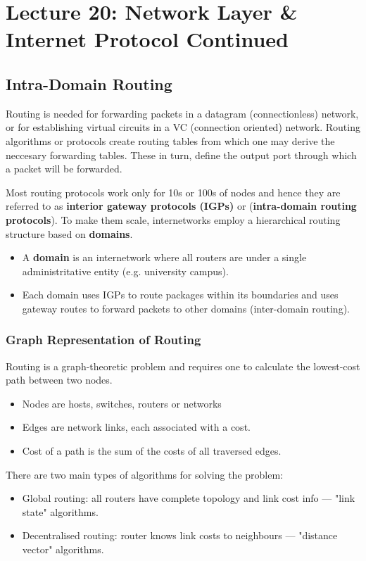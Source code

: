 \documentclass{article}%
\begin{document}
\maketitle
\section{Lecture 20: Network Layer \& Internet Protocol Continued}


\subsection{Intra-Domain Routing}
\label{sec:orgc3bc4c0}
Routing is needed for forwarding packets in a datagram (connectionless) network, or for establishing virtual circuits in a VC (connection oriented) network.
Routing algorithms or protocols create routing tables from which one may derive the neccesary forwarding tables.
These in turn, define the output port through which a packet will be forwarded.

Most routing protocols work only for 10s or 100s of nodes and hence they are referred to as \textbf{interior gateway protocols (IGPs)} or (\textbf{intra-domain routing protocols}).
To make them scale, internetworks employ a hierarchical routing structure based on \textbf{domains}.
\begin{itemize}
\item A \textbf{domain} is an internetwork where all routers are under a single administritative entity (e.g. university campus).
\item Each domain uses IGPs to route packages within its boundaries and uses gateway routes to forward packets to other domains (inter-domain routing).
\end{itemize}

\subsubsection{Graph Representation of Routing}
\label{sec:org055c70c}
Routing is a graph-theoretic problem and requires one to calculate the lowest-cost path between two nodes.
\begin{itemize}
\item Nodes are hosts, switches, routers or networks
\item Edges are network links, each associated with a cost.
\item Cost of a path is the sum of the costs of all traversed edges.
\end{itemize}
There are two main types of algorithms for solving the problem:
\begin{itemize}
\item Global routing: all routers have complete topology and link cost info --- "link state" algorithms.
\item Decentralised routing: router knows link costs to neighbours --- "distance vector" algorithms.
\end{itemize}
\end{document}
